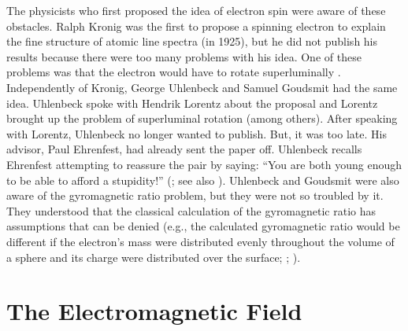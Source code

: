 \documentclass[12pt,secnumarabic,amsmath,amssymb,balancelastpage,nofootinbib]{article}
\begin{document}
The physicists who first proposed the idea of electron spin were aware of these obstacles.  Ralph Kronig was the first to propose a spinning electron to explain the fine structure of atomic line spectra (in 1925), but he did not publish his results because there were too many problems with his idea.  One of these problems was that the electron would have to rotate superluminally \citep[pg.\ 35]{tomonaga}.  Independently of Kronig, George Uhlenbeck and Samuel Goudsmit had the same idea.  Uhlenbeck spoke with Hendrik Lorentz about the proposal and Lorentz brought up the problem of superluminal rotation (among others).  After speaking with Lorentz, Uhlenbeck no longer wanted to publish.  But, it was too late.  His advisor, Paul Ehrenfest, had already sent the paper off.  Uhlenbeck recalls Ehrenfest attempting to reassure the pair by saying: ``You are both young enough to be able to afford a stupidity!'' (\citealp[pg.\ 47]{uhlenbeck}; see also \citealp{goudsmit}).  Uhlenbeck and Goudsmit were also aware of the gyromagnetic ratio problem, but they were not so troubled by it.  They understood that the classical calculation of the gyromagnetic ratio has assumptions that can be denied (e.g., the calculated gyromagnetic ratio would be different if the electron's mass were distributed evenly throughout the volume of a sphere and its charge were distributed over the surface; \citealp[pg.\ 47]{uhlenbeck}; \citealp[pg.\ 39]{pais1989}).

\section{The Electromagnetic Field}
\end{document}
